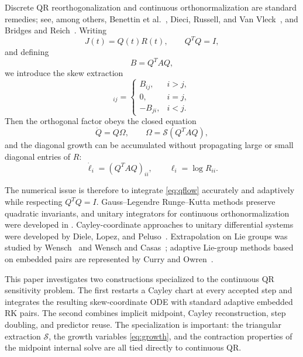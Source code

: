 \documentclass[11pt]{article}
\newcommand{\Sop}{\mathcal{S}}
\begin{document}
Discrete QR reorthogonalization and continuous orthonormalization are standard remedies; see, among others, Benettin et al.~\cite{Benettin1980}, Dieci, Russell, and Van Vleck~\cite{DieciRussellVanVleck1994,DieciRussellVanVleck1997}, and Bridges and Reich~\cite{BridgesReich2001}. Writing
\begin{equation}
 J(t)=Q(t)R(t),\qquad Q^TQ=I,
 \label{eq:qr}
\end{equation}
and defining
\begin{equation}
 B=Q^TAQ,
 \label{eq:B}
\end{equation}
we introduce the skew extraction
\begin{equation}
 [\Sop(B)]_{ij}=\begin{cases}
 B_{ij},&i>j,\\
 0,&i=j,\\
 -B_{ji},&i<j.
 \end{cases}
 \label{eq:S}
\end{equation}
Then the orthogonal factor obeys the closed equation
\begin{equation}
 \dot Q=Q\Omega,\qquad \Omega=\Sop(Q^TAQ),
 \label{eq:qflow}
\end{equation}
and the diagonal growth can be accumulated without propagating large or small diagonal entries of $R$:
\begin{equation}
 \dot\ell_i=(Q^TAQ)_{ii},\qquad \ell_i=\log R_{ii}.
 \label{eq:growth}
\end{equation}

The numerical issue is therefore to integrate \eqref{eq:qflow} accurately and adaptively while respecting $Q^TQ=I$. Gauss--Legendre Runge--Kutta methods preserve quadratic invariants, and unitary integrators for continuous orthonormalization were developed in \cite{DieciRussellVanVleck1994}. Cayley-coordinate approaches to unitary differential systems were developed by Diele, Lopez, and Peluso~\cite{DieleLopezPeluso1998}. Extrapolation on Lie groups was studied by Wensch~\cite{Wensch2001} and Wensch and Casas~\cite{WenschCasas2002}; adaptive Lie-group methods based on embedded pairs are represented by Curry and Owren~\cite{CurryOwren2019}.

This paper investigates two constructions specialized to the continuous QR sensitivity problem. The first restarts a Cayley chart at every accepted step and integrates the resulting skew-coordinate ODE with standard adaptive embedded RK pairs. The second combines implicit midpoint, Cayley reconstruction, step doubling, and predictor reuse. The specialization is important: the triangular extraction $\Sop$, the growth variables \eqref{eq:growth}, and the contraction properties of the midpoint internal solve are all tied directly to continuous QR.
\end{document}
